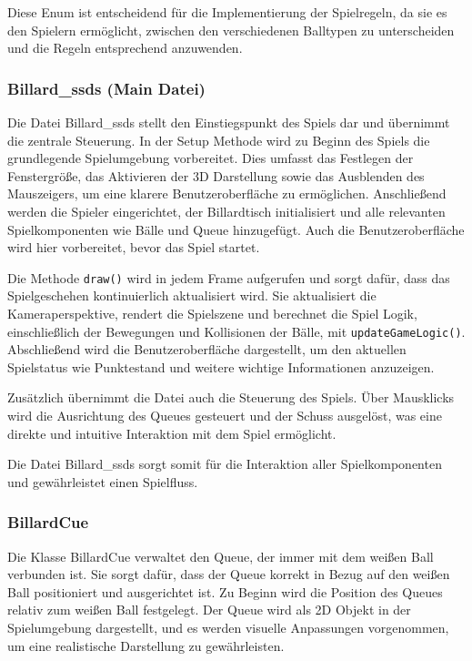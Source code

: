 \documentclass[a4paper,12pt]{article}
\begin{document}
	Diese Enum ist entscheidend für die Implementierung der Spielregeln, da sie es den Spielern ermöglicht, zwischen den verschiedenen Balltypen zu unterscheiden und die Regeln entsprechend anzuwenden.


	
 \subsubsection{Billard\_ssds (Main Datei)}

Die Datei Billard\_ssds stellt den Einstiegspunkt des Spiels dar und übernimmt die zentrale Steuerung. In der Setup Methode wird zu Beginn des Spiels die grundlegende Spielumgebung vorbereitet. Dies umfasst das Festlegen der Fenstergröße, das Aktivieren der 3D Darstellung sowie das Ausblenden des Mauszeigers, um eine klarere Benutzeroberfläche zu ermöglichen. Anschließend werden die Spieler  eingerichtet, der Billardtisch initialisiert und alle relevanten Spielkomponenten wie Bälle und Queue hinzugefügt. Auch die Benutzeroberfläche wird hier vorbereitet, bevor das Spiel startet.

Die Methode \texttt{draw()} wird in jedem Frame aufgerufen und sorgt dafür, dass das Spielgeschehen kontinuierlich aktualisiert wird. Sie aktualisiert die Kameraperspektive, rendert die Spielszene und berechnet die Spiel Logik, einschließlich der Bewegungen und Kollisionen der Bälle, mit \texttt{updateGameLogic()}. Abschließend wird die Benutzeroberfläche dargestellt, um den aktuellen Spielstatus wie Punktestand und weitere wichtige Informationen anzuzeigen.

Zusätzlich übernimmt die Datei auch die Steuerung des Spiels. Über Mausklicks wird die Ausrichtung des Queues gesteuert und der Schuss ausgelöst, was eine direkte und intuitive Interaktion mit dem Spiel ermöglicht.

Die Datei Billard\_ssds sorgt somit für die Interaktion aller Spielkomponenten und gewährleistet einen Spielfluss.

		
		
	
	\subsubsection{BillardCue}
	
	
	Die Klasse BillardCue verwaltet den Queue, der immer mit dem weißen Ball verbunden ist. Sie sorgt dafür, dass der Queue korrekt in Bezug auf den weißen Ball positioniert und ausgerichtet ist. Zu Beginn wird die Position des Queues relativ zum weißen Ball festgelegt. Der Queue wird als 2D Objekt in der Spielumgebung dargestellt, und es werden visuelle Anpassungen vorgenommen, um eine realistische Darstellung zu gewährleisten.
	
\end{document}
